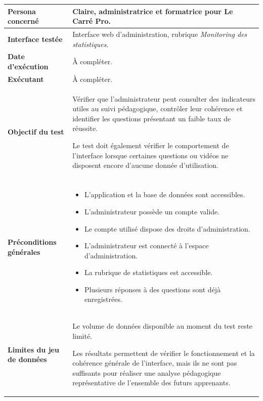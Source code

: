 \begin{longtable}{
    |>{\raggedright\arraybackslash}p{}
    |>{\raggedright\arraybackslash}p{}|
}
\textbf{Persona concerné}
&
Claire, administratrice et formatrice pour Le Carré Pro.
\\
\hline

\textbf{Interface testée}
&
Interface web d'administration, rubrique
\textit{Monitoring des statistiques}.
\\
\hline

\textbf{Date d'exécution}
&
À compléter.
\\
\hline

\textbf{Exécutant}
&
À compléter.
\\
\hline

\textbf{Objectif du test}
&
Vérifier que l'administrateur peut consulter des indicateurs utiles au suivi
pédagogique, contrôler leur cohérence et identifier les questions présentant
un faible taux de réussite.

Le test doit également vérifier le comportement de l'interface lorsque
certaines questions ou vidéos ne disposent encore d'aucune donnée
d'utilisation.
\\
\hline


\rowcolor{orange!50}
\multicolumn{2}{|c|}{
    \textbf{Préconditions}
}
\\
\hline

\textbf{Préconditions générales}
&
\begin{itemize}[leftmargin=*,nosep]
    \item L'application et la base de données sont accessibles.
    \item L'administrateur possède un compte valide.
    \item Le compte utilisé dispose des droits d'administration.
    \item L'administrateur est connecté à l'espace d'administration.
    \item La rubrique de statistiques est accessible.
    \item Plusieurs réponses à des questions sont déjà enregistrées.
\end{itemize}
\\
\hline

\textbf{Limites du jeu de données}
&
Le volume de données disponible au moment du test reste limité.

Les résultats permettent de vérifier le fonctionnement et la cohérence
générale de l'interface, mais ils ne sont pas suffisants pour réaliser une
analyse pédagogique représentative de l'ensemble des futurs apprenants.
\\
\hline


\end{longtable}
